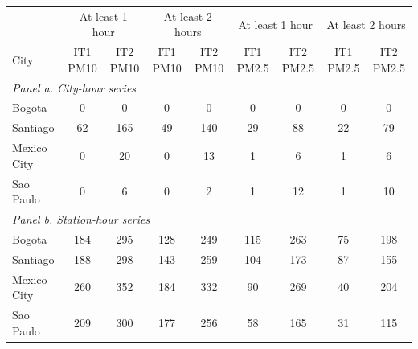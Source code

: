 \begin{tabular}{lcccc|cccc}
    \toprule
    \toprule
     & \multicolumn{2}{c}{At least 1 hour} & \multicolumn{2}{c}{At least 2 hours} & \multicolumn{2}{c}{At least 1 hour} & \multicolumn{2}{c}{At least 2 hours} \\
    City & IT1 PM10 & IT2 PM10 & IT1 PM10 & IT2 PM10 & IT1 PM2.5 & IT2 PM2.5 & IT1 PM2.5 & IT2 PM2.5 \\
    \midrule
    \multicolumn{9}{l}{\textit{Panel a. City-hour series}} \\
    \midrule
    Bogota & 0 & 0 & 0 & 0 & 0 & 0 & 0 & 0 \\
    Santiago & 62 & 165 & 49 & 140 & 29 & 88 & 22 & 79 \\
    Mexico City & 0 & 20 & 0 & 13 & 1 & 6 & 1 & 6 \\
    Sao Paulo & 0 & 6 & 0 & 2 & 1 & 12 & 1 & 10 \\
    \midrule
    \multicolumn{9}{l}{\textit{Panel b. Station-hour series}} \\
    \midrule
    Bogota & 184 & 295 & 128 & 249 & 115 & 263 & 75 & 198 \\
    Santiago & 188 & 298 & 143 & 259 & 104 & 173 & 87 & 155 \\
    Mexico City & 260 & 352 & 184 & 332 & 90 & 269 & 40 & 204 \\
    Sao Paulo & 209 & 300 & 177 & 256 & 58 & 165 & 31 & 115 \\
    \bottomrule
    \bottomrule
\end{tabular}
